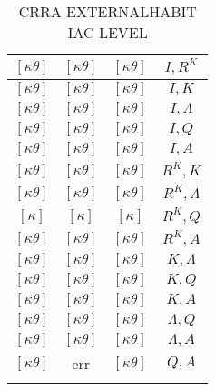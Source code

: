 \documentclass[a4paper,10pt]{article}
\begin{document}
\begin{longtable}{|c|c|c|c|}
\hline
$[\kappa \theta ]$ & $[\kappa \theta ]$ & $[\kappa \theta ]$ & ${I},{R^{K}}$ \\
\hline
$[\kappa \theta ]$ & $[\kappa \theta ]$ & $[\kappa \theta ]$ & ${I},{K}$ \\
\hline
$[\kappa \theta ]$ & $[\kappa \theta ]$ & $[\kappa \theta ]$ & ${I},{\Lambda}$ \\
\hline
$[\kappa \theta ]$ & $[\kappa \theta ]$ & $[\kappa \theta ]$ & ${I},{Q}$ \\
\hline
$[\kappa \theta ]$ & $[\kappa \theta ]$ & $[\kappa \theta ]$ & ${I},{A}$ \\
\hline
$[\kappa \theta ]$ & $[\kappa \theta ]$ & $[\kappa \theta ]$ & ${R^{K}},{K}$ \\
\hline
$[\kappa \theta ]$ & $[\kappa \theta ]$ & $[\kappa \theta ]$ & ${R^{K}},{\Lambda}$ \\
\hline
$[\kappa ]$ & $[\kappa ]$ & $[\kappa ]$ & ${R^{K}},{Q}$ \\
\hline
$[\kappa \theta ]$ & $[\kappa \theta ]$ & $[\kappa \theta ]$ & ${R^{K}},{A}$ \\
\hline
$[\kappa \theta ]$ & $[\kappa \theta ]$ & $[\kappa \theta ]$ & ${K},{\Lambda}$ \\
\hline
$[\kappa \theta ]$ & $[\kappa \theta ]$ & $[\kappa \theta ]$ & ${K},{Q}$ \\
\hline
$[\kappa \theta ]$ & $[\kappa \theta ]$ & $[\kappa \theta ]$ & ${K},{A}$ \\
\hline
$[\kappa \theta ]$ & $[\kappa \theta ]$ & $[\kappa \theta ]$ & ${\Lambda},{Q}$ \\
\hline
$[\kappa \theta ]$ & $[\kappa \theta ]$ & $[\kappa \theta ]$ & ${\Lambda},{A}$ \\
\hline
$[\kappa \theta ]$ & err & $[\kappa \theta ]$ & ${Q},{A}$ \\
\hline
\caption{CRRA EXTERNALHABIT IAC LEVEL}
\label{table:MyTableLabel}
\end{longtable}
\end{document}
